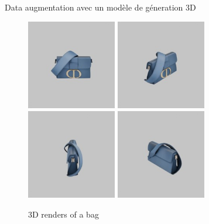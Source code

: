 \documentclass{beamer}
\begin{document}
\begin{frame}{Data augmentation avec un modèle de géneration 3D}
    \begin{figure}
        \centering
        \includegraphics[width=0.35\textwidth]{assets/M9204UMOSM49E-1.jpeg}
        \includegraphics[width=0.35\textwidth]{assets/M9204UMOSM49E-2.jpeg}
        \includegraphics[width=0.35\textwidth]{assets/M9204UMOSM49E-3.jpeg}
        \includegraphics[width=0.35\textwidth]{assets/M9204UMOSM49E-4.jpeg}
        \caption{3D renders of a bag}
    \end{figure}
\end{frame}
\end{document}

